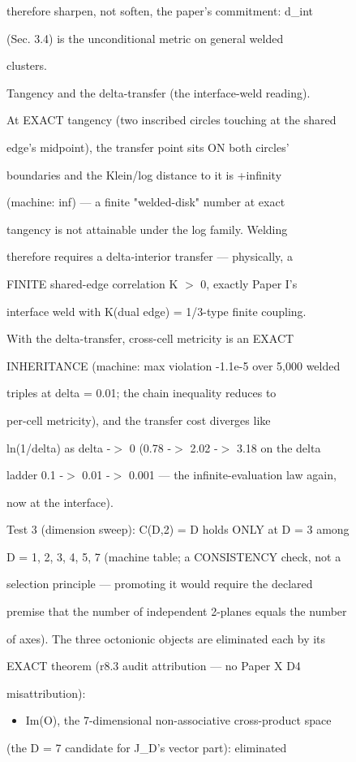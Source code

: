 \documentclass[11pt,a4paper]{article}
\theoremstyle{definition}
\begin{document}
therefore sharpen, not soften, the paper's commitment: d\_int

(Sec. 3.4) is the unconditional metric on general welded

clusters.


Tangency and the delta-transfer (the interface-weld reading).

At EXACT tangency (two inscribed circles touching at the shared

edge's midpoint), the transfer point sits ON both circles'

boundaries and the Klein/log distance to it is +infinity

(machine: inf) — a finite "welded-disk" number at exact

tangency is not attainable under the log family. Welding

therefore requires a delta-interior transfer — physically, a

FINITE shared-edge correlation K $>$ 0, exactly Paper I's

interface weld with K(dual edge) = 1/3-type finite coupling.

With the delta-transfer, cross-cell metricity is an EXACT

INHERITANCE (machine: max violation -1.1e-5 over 5,000 welded

triples at delta = 0.01; the chain inequality reduces to

per-cell metricity), and the transfer cost diverges like

ln(1/delta) as delta -$>$ 0 (0.78 -$>$ 2.02 -$>$ 3.18 on the delta

ladder 0.1 -$>$ 0.01 -$>$ 0.001 — the infinite-evaluation law again,

now at the interface).


Test 3 (dimension sweep): C(D,2) = D holds ONLY at D = 3 among

D = 1, 2, 3, 4, 5, 7 (machine table; a CONSISTENCY check, not a

selection principle — promoting it would require the declared

premise that the number of independent 2-planes equals the number

of axes). The three octonionic objects are eliminated each by its

EXACT theorem (r8.3 audit attribution — no Paper X D4

misattribution):

\begin{itemize}[leftmargin=1.4em]
\item Im(O), the 7-dimensional non-associative cross-product space
\end{itemize}
    (the D = 7 candidate for J\_D's vector part): eliminated
\end{document}
